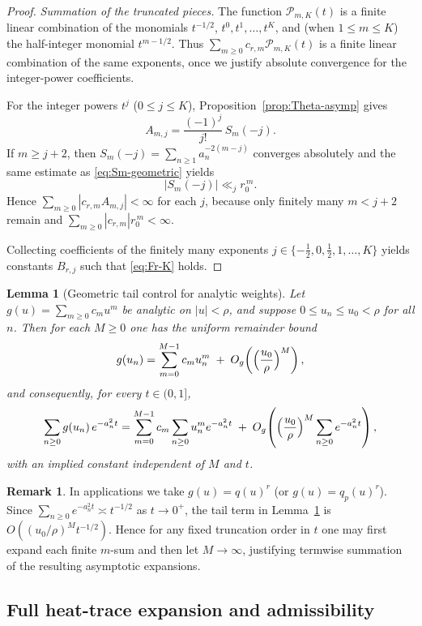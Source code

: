 \documentclass[11pt,letterpaper]{amsart}
\numberwithin{equation}{section}
\newtheorem{lemma}[theorem]{Lemma}
\theoremstyle{definition}
\newtheorem{remark}[theorem]{Remark}
\begin{document}
\begin{proof}
\medskip
\noindent\emph{Summation of the truncated pieces.}
The function $\mathcal{P}_{m,K}(t)$ is a finite linear combination of the monomials
$t^{-1/2}$, $t^0,t^1,\dots,t^K$, and (when $1\le m\le K$) the half-integer monomial $t^{m-1/2}$.
Thus $\sum_{m\ge0}c_{r,m}\mathcal{P}_{m,K}(t)$ is a finite linear combination of the same exponents,
once we justify absolute convergence for the integer-power coefficients.

For the integer powers $t^j$ ($0\le j\le K$), Proposition~\ref{prop:Theta-asymp} gives
\[
A_{m,j}=\frac{(-1)^j}{j!}\,S_m(-j).
\]
If $m\ge j+2$, then $S_m(-j)=\sum_{n\ge1}a_n^{-2(m-j)}$ converges absolutely and the same estimate as
\eqref{eq:Sm-geometric} yields
\[
|S_m(-j)|\ll_j r_0^{\,m}.
\]
Hence $\sum_{m\ge0}|c_{r,m}A_{m,j}|<\infty$ for each $j$, because only finitely many $m<j+2$ remain and
$\sum_{m\ge0}|c_{r,m}|r_0^{\,m}<\infty$.

Collecting coefficients of the finitely many exponents
$j\in\{-\tfrac12,0,\tfrac12,1,\dots,K\}$ yields constants $B_{r,j}$ such that
\eqref{eq:Fr-K} holds.
\end{proof}

\begin{lemma}[Geometric tail control for analytic weights]\label{lem:analytic-weight-tail}
Let $g(u)=\sum_{m\ge0}c_m u^m$ be analytic on $|u|<\rho$, and suppose $0\le u_n\le u_0<\rho$ for all $n$.
Then for each $M\ge0$ one has the uniform remainder bound
\[
g(u_n)=\sum_{m=0}^{M-1}c_m u_n^m \;+\; O_g\!\left(\Bigl(\frac{u_0}{\rho}\Bigr)^M\right),
\]
and consequently, for every $t\in(0,1]$,
\[
\sum_{n\ge0} g(u_n)\,e^{-a_n^2 t}
=
\sum_{m=0}^{M-1} c_m \sum_{n\ge0} u_n^m e^{-a_n^2 t}
\;+\;
O_g\!\left(\Bigl(\frac{u_0}{\rho}\Bigr)^M\sum_{n\ge0}e^{-a_n^2 t}\right),
\]
with an implied constant independent of $M$ and $t$.
\end{lemma}

\begin{remark}\label{rem:analytic-weight-tail-use}
In applications we take $g(u)=q(u)^r$ (or $g(u)=q_p(u)^r$). Since
$\sum_{n\ge0}e^{-a_n^2 t}\asymp t^{-1/2}$ as $t\to0^+$, the tail term in
Lemma~\ref{lem:analytic-weight-tail} is $O((u_0/\rho)^M t^{-1/2})$. Hence for any fixed truncation
order in $t$ one may first expand each finite $m$-sum and then let $M\to\infty$, justifying
termwise summation of the resulting asymptotic expansions.
\end{remark}


\subsection{Full heat-trace expansion and admissibility}\label{sec:final}
\end{document}
